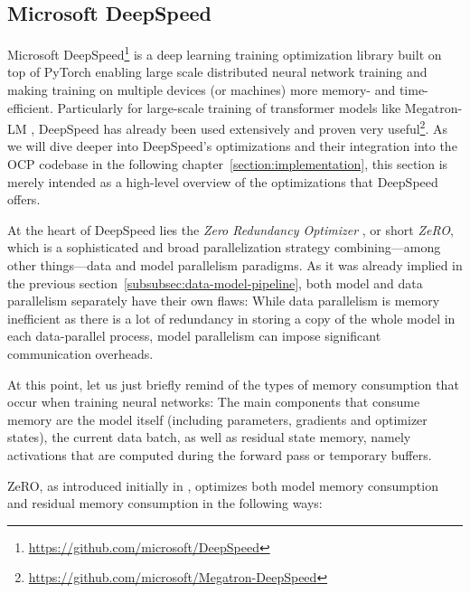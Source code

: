 \subsection{Microsoft DeepSpeed}

Microsoft DeepSpeed\footnote{\url{https://github.com/microsoft/DeepSpeed}} is
a deep learning training optimization library built on top of PyTorch enabling
large scale distributed neural network training and making training on multiple devices 
(or machines) more memory- and time-efficient. Particularly for large-scale training of
transformer models like Megatron-LM \cite{10.48550/ARXIV.1909.08053}, DeepSpeed has
already been used extensively and proven very 
useful\footnote{\url{https://github.com/microsoft/Megatron-DeepSpeed}}.
As we will dive deeper into DeepSpeed's optimizations and their integration 
into the OCP codebase in the following chapter~\ref{section:implementation}, this 
section is merely intended as a high-level overview of the optimizations that 
DeepSpeed offers.

At the heart of DeepSpeed lies the \textit{Zero Redundancy Optimizer} 
\cite{https://doi.org/10.48550/arxiv.1910.02054,DBLP:journals/corr/abs-2101-06840,DBLP:journals/corr/abs-2104-07857},
or short \textit{ZeRO}, which is a sophisticated and broad parallelization strategy 
combining---among other things---data and model parallelism paradigms.
As it was already implied in the previous section~\ref{subsubsec:data-model-pipeline},
both model and data parallelism separately have their own flaws: While data parallelism
is memory inefficient as there is a lot of redundancy in storing a copy of the whole 
model in each data-parallel process, model parallelism can impose significant communication
overheads. 

At this point, let us just briefly remind of the types of memory consumption 
that occur when training neural networks: The main components that consume memory are the 
model itself (including parameters, gradients and optimizer states), 
the current data batch, as well as residual state memory, namely activations that are 
computed during the forward pass or temporary buffers.

ZeRO, as introduced initially in \cite{https://doi.org/10.48550/arxiv.1910.02054},
optimizes both model memory consumption and residual memory consumption in the
following ways:

